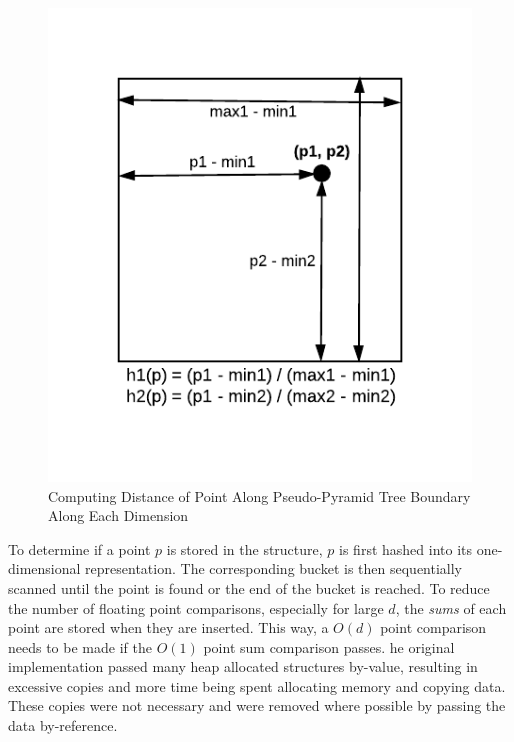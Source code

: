 \begin{figure}
	\vspace{-40pt}
	\begin{center}
		\includegraphics[scale=0.6]{figures/pseudo-pyramid_tree_point_boundary_distances.pdf}
	\end{center}
	\vspace{-20pt}
	\caption{Computing Distance of Point Along Pseudo-Pyramid Tree Boundary Along Each Dimension}
	\label{fig:point-boundary-distance}
\end{figure}

To determine if a point $p$ is stored in the structure, $p$ is first hashed into its one-dimensional representation. The corresponding bucket is then sequentially scanned until the point is found or the end of the bucket is reached. To reduce the number of floating point comparisons, especially for large $d$, the \textit{sums} of each point are stored when they are inserted. This way, a $O(d)$ point comparison needs to be made if the $O(1)$ point sum comparison passes. he original implementation passed many heap allocated structures by-value, resulting in excessive copies and more time being spent allocating memory and copying data. These copies were not necessary and were removed where possible by passing the data by-reference. 

